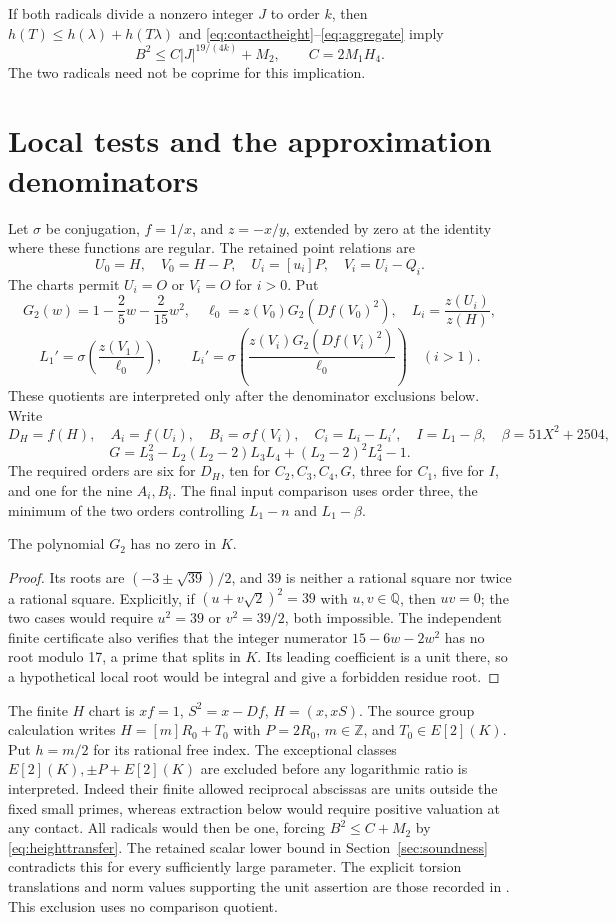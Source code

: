 \documentclass[11pt,a4paper]{article}
\newcommand{\Q}{\mathbb Q}\newcommand{\Z}{\mathbb Z}\newcommand{\HH}{\mathcal H}
\begin{document}
If both radicals divide a nonzero integer $J$ to order $k$, then
$h(T)\le h(\lambda)+h(T\lambda)$ and
\eqref{eq:contactheight}--\eqref{eq:aggregate} imply
\begin{equation}\label{eq:heighttransfer}
 B^2\le C|J|^{19/(4k)}+M_2,\qquad C=2M_1H_4.
\end{equation}
The two radicals need not be coprime for this implication.

\section{Local tests and the approximation denominators}
Let $\sigma$ be conjugation, $f=1/x$, and $z=-x/y$, extended by zero
at the identity where these functions are regular. The retained
point relations are
\[
 U_0=H,\quad V_0=H-P,\quad U_i=[u_i]P,\quad V_i=U_i-Q_i.
\]
The charts permit $U_i=O$ or $V_i=O$ for $i>0$.
Put
\[
 G_2(w)=1-\frac25w-\frac2{15}w^2,
 \quad \ell_0=z(V_0)G_2(Df(V_0)^2),\quad
 L_i=\frac{z(U_i)}{z(H)},
\]
\[
 L_1'=\sigma\!\left(\frac{z(V_1)}{\ell_0}\right),\qquad
 L_i'=\sigma\!\left(\frac{z(V_i)G_2(Df(V_i)^2)}{\ell_0}\right)\quad(i>1).
\]
These quotients are interpreted only after the denominator exclusions
below. Write
\[
 D_H=f(H),\quad A_i=f(U_i),\quad B_i=\sigma f(V_i),\quad
 C_i=L_i-L_i',\quad I=L_1-\beta,\quad \beta=51X^2+2504,
\]
\[
 G=L_3^2-L_2(L_2-2)L_3L_4+(L_2-2)^2L_4^2-1.
\]
The required orders are six for $D_H$, ten for $C_2,C_3,C_4,G$,
three for $C_1$, five for $I$, and one for the nine $A_i,B_i$.
The final input comparison uses order three, the minimum of the two
orders controlling $L_1-n$ and $L_1-\beta$.

\begin{lemma}\label{lem:g2}
The polynomial $G_2$ has no zero in $K$.
\end{lemma}
\begin{proof}
Its roots are $(-3\pm\sqrt{39})/2$, and $39$ is neither a rational
square nor twice a rational square. Explicitly, if
$(u+v\sqrt2)^2=39$ with $u,v\in\Q$, then $uv=0$; the two cases
would require $u^2=39$ or $v^2=39/2$, both impossible.
The independent finite certificate also verifies that the integer
numerator $15-6w-2w^2$ has no root modulo 17, a prime that splits in
$K$. Its leading coefficient is a unit there, so a hypothetical local
root would be integral and give a forbidden residue root.
\end{proof}

The finite $H$ chart is $xf=1$, $S^2=x-Df$, $H=(x,xS)$.
The source group calculation writes $H=[m]R_0+T_0$ with $P=2R_0$,
$m\in\Z$, and $T_0\in E[2](K)$. Put $h=m/2$ for its rational
free index. The exceptional classes $E[2](K),\pm P+E[2](K)$ are
excluded before any logarithmic ratio is interpreted. Indeed their
finite allowed reciprocal abscissas are units outside the fixed small
primes, whereas extraction below would require positive valuation
at any contact. All radicals would then be one, forcing
$B^2\le C+M_2$ by \eqref{eq:heighttransfer}. The retained scalar
lower bound in Section~\ref{sec:soundness} contradicts this for every
sufficiently large parameter. The explicit torsion translations and
norm values supporting the unit assertion are those recorded in
\cite[Section 3]{Even}. This exclusion uses no comparison quotient.
\end{document}
